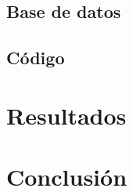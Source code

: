 \documentclass{book}
\theoremstyle{plain}
\theoremstyle{definition}
\theoremstyle{remark}
\begin{document}
\newpage
\section{Base de datos}

\section{Código}

\chapter{Resultados}

\chapter{Conclusión}
\end{document}
